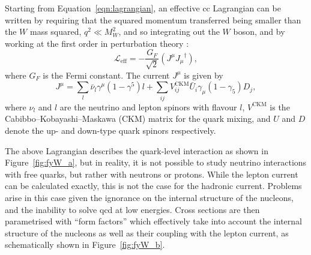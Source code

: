 

Starting from Equation~\eqref{eqn:lagrangian}, an effective \acrshort{cc} Lagrangian can be written by requiring that the squared momentum transferred being smaller than the $W$ mass squared, $q^2 \ll M_W^2$, and so integrating out the $W$ boson, and by working at the first order in perturbation theory \cite{halzen}: 
\begin{equation}
\mathcal{L}_\text{eff} = - \frac{G_F}{\sqrt{2}} \left ( J^{\mu} {J_\mu}^\dagger \right ),
\end{equation}
where $G_F$ is the Fermi constant. The current $J^{\mu}$ is given by
\begin{equation}
J^{\mu} = \sum_l \bar{\nu}_l\gamma^\mu(1-\gamma^5)l + \sum_{ij} V_{ij}^\text{CKM} \bar{U}_i\gamma_\mu(1-\gamma_5)D_j,
\end{equation}
where $\nu_l$ and $l$ are the neutrino and lepton spinors with flavour $l$, $V^\text{CKM}$ is the Cabibbo–Kobayashi–Maskawa (CKM) matrix for the quark mixing, and $U$ and $D$ denote the up- and down-type quark spinors respectively.


The above Lagrangian describes the quark-level interaction as shown in Figure~\ref{fig:fyW_a}, but in reality, it is not possible to study neutrino interactions with free quarks, but rather with neutrons or protons. While the lepton current can be calculated exactly, this is not the case for the hadronic current. Problems arise in this case given the ignorance on the internal structure of the nucleons, and the inability to solve \acrfull{qcd} at low energies. 
Cross sections are then parametrised with ``form factors'' which effectively take into account the internal structure of the nucleons as well as their coupling with the lepton current, as schematically shown in Figure~\ref{fig:fyW_b}.

